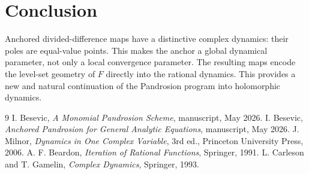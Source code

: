 \documentclass[11pt]{article}
\theoremstyle{definition}
\begin{document}
\section{Conclusion}

Anchored divided-difference maps have a distinctive complex dynamics: their poles are equal-value points. This makes the anchor a global dynamical parameter, not only a local convergence parameter. The resulting maps encode the level-set geometry of $F$ directly into the rational dynamics. This provides a new and natural continuation of the Pandrosion program into holomorphic dynamics.

\begin{thebibliography}{9}
I. Besevic, \emph{A Monomial Pandrosion Scheme}, manuscript, May 2026.
I. Besevic, \emph{Anchored Pandrosion for General Analytic Equations}, manuscript, May 2026.
J. Milnor, \emph{Dynamics in One Complex Variable}, 3rd ed., Princeton University Press, 2006.
A. F. Beardon, \emph{Iteration of Rational Functions}, Springer, 1991.
L. Carleson and T. Gamelin, \emph{Complex Dynamics}, Springer, 1993.
\end{thebibliography}
\end{document}
